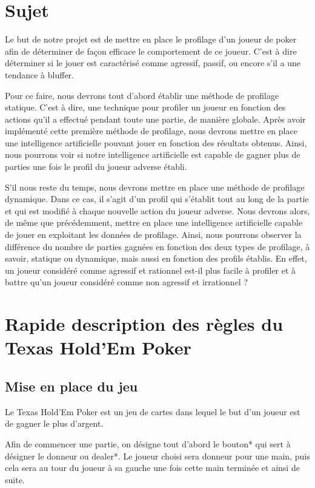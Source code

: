 \documentclass{report}
\begin{document}
\section{Sujet}
\hspace{0.5cm}Le but de notre projet est de mettre en place le profilage d'un joueur de poker afin de déterminer de façon efficace le comportement de ce joueur. C'est à dire déterminer si le jouer est caractérisé comme agressif, passif, ou encore s'il a une tendance à bluffer.\par
Pour ce faire, nous devrons tout d'abord établir une méthode de profilage statique. C'est à dire, une technique pour profiler un joueur en fonction des actions qu'il a effectué pendant toute une partie, de manière globale. Après avoir implémenté cette première méthode de profilage, nous devrons mettre en place une intelligence artificielle pouvant jouer en fonction des résultats obtenus. Ainsi, nous pourrons voir si notre intelligence artificielle est capable de gagner plus de parties une fois le profil du joueur adverse établi.\par
S'il nous reste du temps, nous devrons mettre en place une méthode de profilage dynamique. Dans ce cas, il s'agit d'un profil qui s’établit tout au long de la partie et qui est modifié à chaque nouvelle action du joueur adverse. Nous devrons alors, de même que précédemment, mettre en place une intelligence artificielle capable de jouer en exploitant les données de profilage. Ainsi, nous pourrons observer la différence du nombre de parties gagnées en fonction des deux types de profilage, à savoir, statique ou dynamique, mais aussi en fonction des profils établis. En effet, un joueur considéré comme agressif et rationnel est-il plus facile à profiler et à battre qu'un joueur considéré comme non agressif et irrationnel ?\par

\section{Rapide description des règles du Texas Hold'Em Poker}
\subsection{Mise en place du jeu}
\hspace{0.5cm}Le Texas Hold'Em Poker est un jeu de cartes dans lequel le but d'un joueur est de gagner le plus d'argent. \par
Afin de commencer une partie, on désigne tout d'abord le bouton* qui sert à désigner le donneur ou dealer*. Le joueur choisi sera donneur pour une main, puis cela sera au tour du joueur à sa gauche une fois cette main terminée et ainsi de suite.  \par
\end{document}
